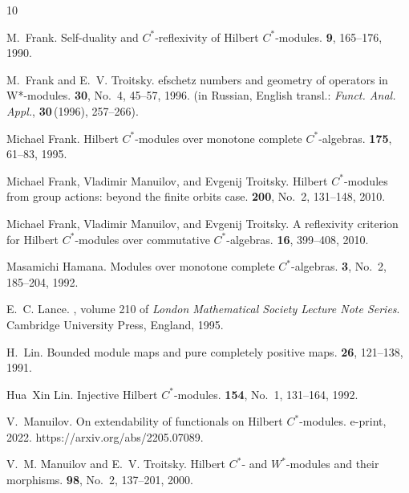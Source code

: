 \documentclass[12pt]{amsart}
\begin{document}
\begin{thebibliography}{10}

{\sc M.~Frank}.
\newblock Self-duality and ${C}^*$-reflexivity of {H}ilbert ${C}^*$-modules.
 {\bf 9}, 165--176, 1990.

{\sc M.~Frank and E.~V. Troitsky}.
efschetz numbers and geometry of operators in {W}*-modules.
 {\bf 30},  No.~4, 45--57, 1996.
\newblock (in Russian, English transl.: {\em Funct. Anal. Appl.}, {\bf
  30\,}(1996), 257--266).

{\sc Michael Frank}.
\newblock Hilbert {$C^*$}-modules over monotone complete {$C^*$}-algebras.
 {\bf 175}, 61--83, 1995.

{\sc Michael Frank, Vladimir Manuilov, and Evgenij Troitsky}.
\newblock Hilbert {$C^*$}-modules from group actions: beyond the finite orbits
  case.
 {\bf 200},  No.~2, 131--148, 2010.

{\sc Michael Frank, Vladimir Manuilov, and Evgenij Troitsky}.
\newblock A reflexivity criterion for {H}ilbert {$C^\ast$}-modules over
  commutative {$C^\ast$}-algebras.
 {\bf 16}, 399--408, 2010.

{\sc Masamichi Hamana}.
\newblock Modules over monotone complete {$C^*$}-algebras.
 {\bf 3},  No.~2, 185--204, 1992.

{\sc E.~C. Lance}.
,
  volume 210 of {\em London Mathematical Society Lecture Note Series}.
\newblock Cambridge University Press, England, 1995.

{\sc H.~Lin}.
\newblock Bounded module maps and pure completely positive maps.
 {\bf 26}, 121--138, 1991.

{\sc Hua~Xin Lin}.
\newblock Injective {H}ilbert {$C^\ast$}-modules.
 {\bf 154},  No.~1, 131--164, 1992.

{\sc V.~Manuilov}.
\newblock On extendability of functionals on {H}ilbert ${C}^*$-modules.
\newblock e-print, 2022.
\newblock https://arxiv.org/abs/2205.07089.

{\sc V.~M. Manuilov and E.~V. Troitsky}.
\newblock Hilbert ${C}^*$- and ${W}^*$-modules and their morphisms.
 {\bf 98},  No.~2, 137--201,
  2000.


\end{thebibliography}
\end{document}
